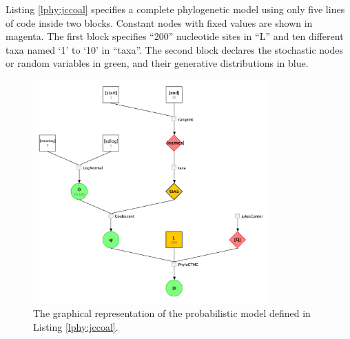 \documentclass[10pt,letterpaper,table]{article}
\begin{document}
\medskip{}

Listing \ref{lphy:jccoal} specifies a complete phylogenetic model using only five lines of code inside two blocks. Constant nodes with fixed values are shown in magenta.  
The first block specifies ``200'' nucleotide sites in ``L'' and ten different taxa named `1' to `10' in ``taxa''. 
The second block declares the stochastic nodes or random variables in green, and their generative distributions in blue.


\begin{figure}
   \includegraphics[width=0.8\textwidth]{figs/jc_coal.png}
  \caption{The graphical representation of the probabilistic model defined in Listing \ref{lphy:jccoal}.} 
  \label{fig:jccoalPGM}
\end{figure}

\end{document}
